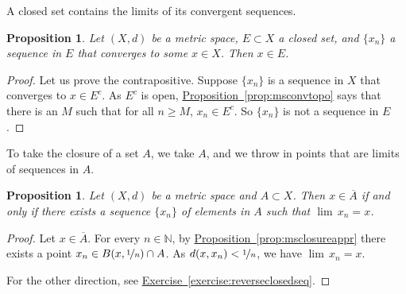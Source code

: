 \documentclass[12pt,openany]{book}
\newcommand{\widebar}[1]{\overline{#1}}
\newcommand{\N}{{\mathbb{N}}}
\theoremstyle{plain}
\newtheorem{prop}[thm]{Proposition}
\theoremstyle{remark}
\theoremstyle{definition}
\theoremstyle{exercise}
\theoremstyle{example}
\newcommand{\exerciseref}[1]{\hyperref[#1]{Exercise~\ref*{#1}}}
\newcommand{\propref}[1]{\hyperref[#1]{Proposition~\ref*{#1}}}
\begin{document}
A closed set contains the limits of its convergent sequences.

\begin{prop} \label{prop:msclosedlim}
Let $(X,d)$ be a metric space, $E \subset X$ a closed set,
and $\{ x_n \}$ a sequence in $E$ that converges to some $x \in X$.
Then $x \in E$.
\end{prop}

\begin{proof}
Let us prove the contrapositive.
Suppose $\{ x_n \}$ is a sequence in $X$ that converges to $x \in E^c$.
As $E^c$ is open, \propref{prop:msconvtopo} says that there is
an $M$ such that for all $n \geq M$,
$x_n \in E^c$.  So $\{ x_n \}$  is not a sequence in $E$.
\end{proof}

To take the closure of a set $A$, we take $A$, and we throw in 
points that are limits of sequences in $A$.

\begin{prop} \label{prop:msclosureapprseq}
Let $(X,d)$ be a metric space and $A \subset X$.
Then $x \in \widebar{A}$ if and only if there exists a sequence $\{ x_n \}$ of
elements in $A$ such that $\lim\, x_n = x$.
\end{prop}

\begin{proof}
Let $x \in \widebar{A}$.  For every $n \in \N$,
by
\propref{prop:msclosureappr} there
exists a point $x_n \in B(x,\nicefrac{1}{n}) \cap A$.
As $d(x,x_n) < \nicefrac{1}{n}$, we have $\lim\, x_n = x$.

For the other direction, see \exerciseref{exercise:reverseclosedseq}.
\end{proof}
\end{document}
